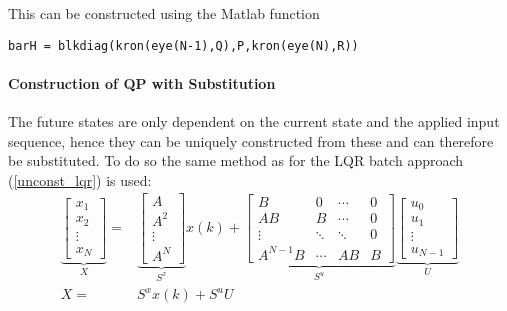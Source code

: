 This can be constructed using the Matlab function

\begin{small}
    \texttt{barH = blkdiag(kron(eye(N-1),Q),P,kron(eye(N),R))}
\end{small}

\paragraph{Construction of QP with Substitution}\label{cftoc_QP_with_subs}

The future states are only dependent on the current state and the applied input sequence, hence they can be uniquely constructed from these and can therefore be substituted. To do so the same method as for the LQR batch approach (\ref{unconst_lqr}) is used:
\begin{align*}
    \underbrace{\begin{bmatrix}
                        x_1    \\
                        x_2    \\
                        \vdots \\
                        x_N
                    \end{bmatrix}}_{X} = &
    \underbrace{\begin{bmatrix}
                        A      \\
                        A^2    \\
                        \vdots \\
                        A^N
                    \end{bmatrix}}_{S^x} x(k) +
    \underbrace{\begin{bmatrix}
                        B        & 0      & \cdots & 0 \\
                        AB       & B      & \cdots & 0 \\
                        \vdots   & \ddots & \ddots & 0 \\
                        A^{N-1}B & \cdots & AB     & B
                    \end{bmatrix}}_{S^u}
    \underbrace{\begin{bmatrix}
                        u_0    \\
                        u_1    \\
                        \vdots \\
                        u_{N-1}
                    \end{bmatrix}}_{U}                 \\
    X =                         & S^x x(k) + S^u U
\end{align*}
